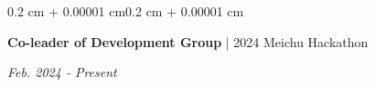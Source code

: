 \documentclass[10pt, letterpaper]{article}
\newenvironment{highlights}{
    \begin{itemize}[
        topsep=0.10 cm,
        parsep=0.10 cm,
        partopsep=0pt,
        itemsep=0pt,
        leftmargin=0.4 cm + 10pt
    ]
}{
    \end{itemize}
}
\newenvironment{onecolentry}{
    \begin{adjustwidth}{0.2 cm + 0.00001 cm}{0.2 cm + 0.00001 cm}
}{
    \end{adjustwidth}
}
\newenvironment{twocolentry}[2][]{
    \onecolentry
    \def\secondColumn{#2}
    \setcolumnwidth{\fill, 4.5 cm}
    \begin{paracol}{2}
}{
    \switchcolumn \raggedleft \secondColumn
    \end{paracol}
    \endonecolentry
}
\let\hrefWithoutArrow\href
\renewcommand{\href}[2]{\hrefWithoutArrow{#1}{\ifthenelse{\equal{#2}{}}{ }{#2 }\raisebox{.15ex}{\footnotesize \faExternalLink*}}}
\begin{document}
        
        \vspace{0.15 cm}
        \begin{twocolentry}{\textit{Feb. 2024 - Present}}
                \textbf{Co-leader of Development Group} | 2024 Meichu Hackathon
        \end{twocolentry}
    
\end{document}
